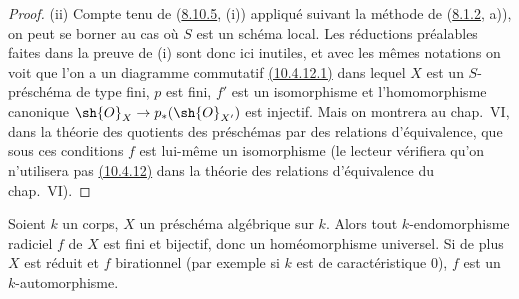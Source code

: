 \begin{proof}
\textup{(ii)} Compte tenu de
({\hyperlink{ega4.c04.thm.8-10-5}{8.10.5}}, (i)) appliqué suivant la
méthode de ({\hyperlink{ega4.c04.statement.8-1-2}{8.1.2}}, a)), on peut
se borner au cas où $S$ est un schéma local. Les réductions préalables
faites dans la preuve de (i) sont donc ici inutiles, et avec les mêmes
notations on voit que l'on a un diagramme commutatif
{\hyperlink{ega4.c04.sec.10-4-12-1}{(10.4.12.1)}} dans lequel $X$ est
un $S$-préschéma de type fini, $p$ est fini, $f'$ est un isomorphisme et
l'homomorphisme canonique $\sh{O}_X\to p_*(\sh{O}_{X'})$ est injectif.
Mais on montrera au chap.~VI, dans la théorie des quotients des
préschémas par des relations d'équivalence, que sous ces conditions $f$
est lui-même un isomorphisme (le lecteur vérifiera qu'on n'utilisera pas
{\hyperlink{ega4.c04.cor.10-4-12}{(10.4.12)}} dans la théorie des
relations d'équivalence du chap.~VI).
\end{proof}

\begin{corollary}[10.4.13]
\label{IV.10.4.13}
Soient $k$ un corps, $X$ un préschéma algébrique sur $k$. Alors tout
$k$-endomorphisme radiciel $f$ de $X$ est fini et bijectif, donc un
homéomorphisme universel. Si de plus $X$ est réduit et $f$ birationnel
(par exemple si $k$ est de caractéristique 0), $f$ est un
$k$-automorphisme.
\end{corollary}

